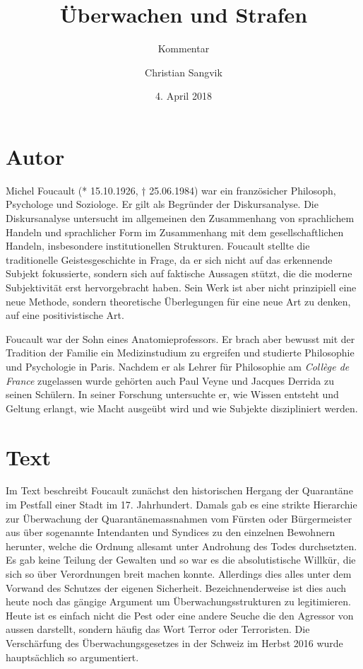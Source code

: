 \documentclass[a4paper,ngerman,11pt]{scrartcl}
\subtitle{Kommentar}
\author{Christian Sangvik}
\date{4. April 2018}
\title{Überwachen und Strafen}
\begin{document}
\maketitle

\section*{Autor}
\label{sec-1}

Michel Foucault (* 15.10.1926, † 25.06.1984) war ein französicher Philosoph,
Psychologe und Soziologe. Er gilt als Begründer der
Diskursanalyse.\cite{wiki:MichelFoucault-de} Die Diskursanalyse untersucht im
allgemeinen den Zusammenhang von sprachlichem Handeln und sprachlicher Form im
Zusammenhang mit dem gesellschaftlichen Handeln, insbesondere institutionellen
Strukturen. Foucault stellte die traditionelle Geistesgeschichte in Frage, da
er sich nicht auf das erkennende Subjekt fokussierte, sondern sich auf
faktische Aussagen stützt, die die moderne Subjektivität erst hervorgebracht
haben. Sein Werk ist aber nicht prinzipiell eine neue Methode, sondern
theoretische Überlegungen für eine neue Art zu denken, auf eine
positivistische Art.\cite{wiki:Diskursanalyse-de}

Foucault war der Sohn eines Anatomieprofessors. Er brach aber bewusst mit der
Tradition der Familie ein Medizinstudium zu ergreifen und studierte
Philosophie und Psychologie in Paris. Nachdem er als Lehrer für Philosophie am
\emph{Collège de France} zugelassen wurde gehörten auch Paul Veyne und Jacques
Derrida zu seinen Schülern.  In seiner Forschung untersuchte er, wie Wissen
entsteht und Geltung erlangt, wie Macht ausgeübt wird und wie Subjekte
diszipliniert werden.\cite{wiki:MichelFoucault-de}

\section*{Text}
\label{sec-2}

Im Text beschreibt Foucault zunächst den historischen Hergang der Quarantäne
im Pestfall einer Stadt im 17. Jahrhundert. Damals gab es eine strikte
Hierarchie zur Überwachung der Quarantänemassnahmen vom Fürsten oder
Bürgermeister aus über sogenannte Intendanten und Syndices zu den einzelnen
Bewohnern herunter, welche die Ordnung allesamt unter Androhung des Todes
durchsetzten. Es gab keine Teilung der Gewalten und so war es die
absolutistische Willkür, die sich so über Verordnungen breit machen
konnte. Allerdings dies alles unter dem Vorwand des Schutzes der eigenen
Sicherheit.\cite{Foucault1977} Bezeichnenderweise ist dies auch heute noch das
gängige Argument um Überwachungsstrukturen zu legitimieren. Heute ist es
einfach nicht die Pest oder eine andere Seuche die den Agressor von aussen
darstellt, sondern häufig das Wort Terror oder Terroristen. Die Verschärfung
des Überwachungsgesetzes in der Schweiz im Herbst 2016 wurde hauptsächlich so
argumentiert.\cite{bundesrat}
\end{document}
